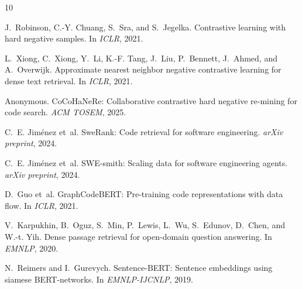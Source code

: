 \documentclass[11pt,a4paper]{article}
\begin{document}
\begin{thebibliography}{10}

J.~Robinson, C.-Y. Chuang, S.~Sra, and S.~Jegelka.
Contrastive learning with hard negative samples.
In \textit{ICLR}, 2021.

L.~Xiong, C.~Xiong, Y.~Li, K.-F. Tang, J.~Liu, P.~Bennett, J.~Ahmed, and A.~Overwijk.
Approximate nearest neighbor negative contrastive learning for dense text retrieval.
In \textit{ICLR}, 2021.

Anonymous.
CoCoHaNeRe: Collaborative contrastive hard negative re-mining for code search.
\textit{ACM TOSEM}, 2025.

C.~E. Jim\'enez et~al.
SweRank: Code retrieval for software engineering.
\textit{arXiv preprint}, 2024.

C.~E. Jim\'enez et~al.
SWE-smith: Scaling data for software engineering agents.
\textit{arXiv preprint}, 2024.

D.~Guo et~al.
GraphCodeBERT: Pre-training code representations with data flow.
In \textit{ICLR}, 2021.

V.~Karpukhin, B.~Oguz, S.~Min, P.~Lewis, L.~Wu, S.~Edunov, D.~Chen, and W.-t. Yih.
Dense passage retrieval for open-domain question answering.
In \textit{EMNLP}, 2020.

N.~Reimers and I.~Gurevych.
Sentence-BERT: Sentence embeddings using siamese BERT-networks.
In \textit{EMNLP-IJCNLP}, 2019.

\end{thebibliography}
\end{document}
